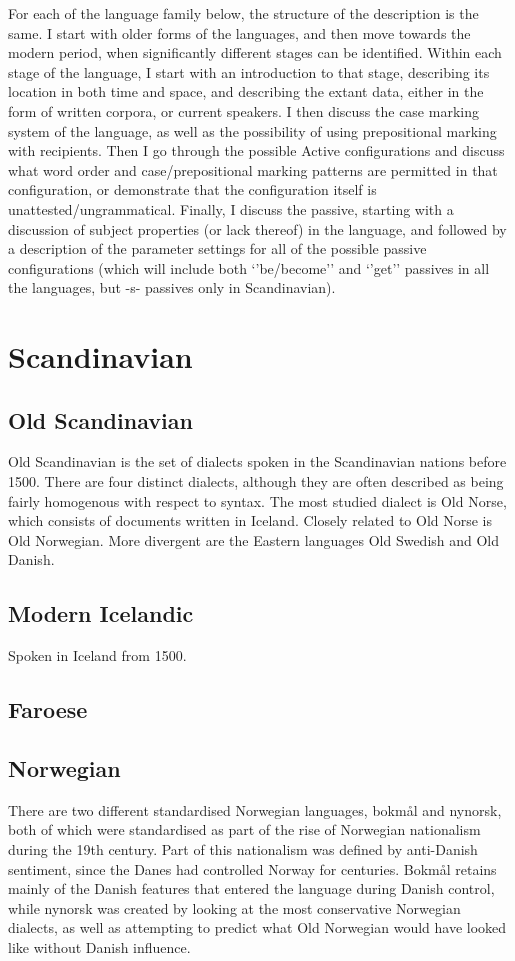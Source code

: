 For each of the language family below, the structure of the description is the same. I start with older forms of the languages, and then move towards the modern period, when significantly different stages can be identified. Within each stage of the language, I start with an introduction to that stage, describing its location in both time and space, and describing the extant data, either in the form of written corpora, or current speakers. I then discuss the case marking system of the language, as well as the possibility of using prepositional marking with recipients. Then I go through the possible Active configurations and discuss what word order and case/prepositional marking patterns are permitted in that configuration, or demonstrate that the configuration itself is unattested/ungrammatical. Finally, I discuss the passive, starting with a discussion of subject properties (or lack thereof) in the language, and followed by a description of the parameter settings for all of the possible passive configurations (which will include both `'be/become'' and `'get'' passives in all the languages, but -s- passives only in Scandinavian).
\section{Scandinavian}
\subsection{Old Scandinavian}\label{sec:OldScand}
Old Scandinavian is the set of dialects spoken in the Scandinavian nations before 1500. There are four distinct dialects, although they are often described as being fairly homogenous with respect to syntax. The most studied dialect is Old Norse, which consists of documents written in Iceland. Closely related to Old Norse is Old Norwegian. More divergent are the Eastern languages Old Swedish and Old Danish.

\subsection{Modern Icelandic}\label{sec:Icelandic}
Spoken in Iceland from 1500.

\subsection{Faroese}\label{sec:Faroese}

\subsection{Norwegian}\label{sec:Norwegian}
There are two different standardised Norwegian languages, bokmål and nynorsk, both of which were standardised as part of the rise of Norwegian nationalism during the 19th century. Part of this nationalism was defined by anti-Danish sentiment, since the Danes had controlled Norway for centuries. Bokmål retains mainly of the Danish features that entered the language during Danish control, while nynorsk was created by looking at the most conservative Norwegian dialects, as well as attempting to predict what Old Norwegian would have looked like without Danish influence.



